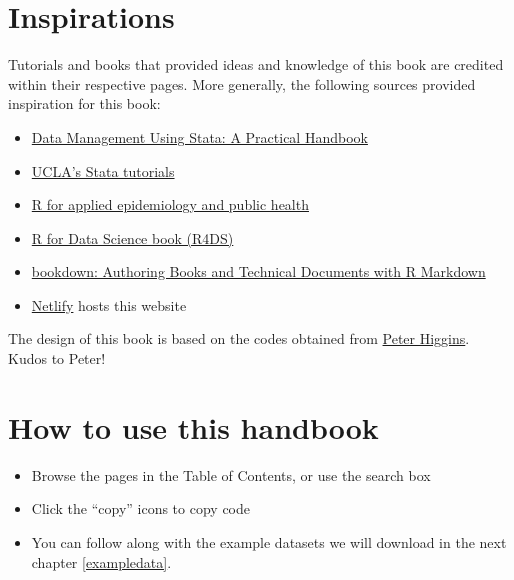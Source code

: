 \documentclass[
]{book}
\providecommand{\tightlist}{%
  \setlength{\itemsep}{0pt}\setlength{\parskip}{0pt}}
\begin{document}
\hypertarget{inspirations}{%
\section*{Inspirations}\label{inspirations}}

Tutorials and books that provided ideas and knowledge of this book are credited within their respective pages. More generally, the following sources provided inspiration for this book:

\begin{itemize}
\tightlist
\item
  \href{https://www.stata.com/bookstore/data-management-using-stata/}{Data Management Using Stata: A Practical Handbook}
\item
  \href{https://stats.idre.ucla.edu/stata/}{UCLA's Stata tutorials}
\item
  \href{https://www.epirhandbook.com/en/}{R for applied epidemiology and public health}
\item
  \href{https://r4ds.had.co.nz/}{R for Data Science book (R4DS)}\\
\item
  \href{https://bookdown.org/yihui/bookdown/}{bookdown: Authoring Books and Technical Documents with R Markdown}
\item
  \href{https://www.netlify.com}{Netlify} hosts this website
\end{itemize}

The design of this book is based on the codes obtained from \href{https://github.com/higgi13425/rmrwr-book}{Peter Higgins}. Kudos to Peter!

\hypertarget{how-to-use-this-handbook}{%
\section*{How to use this handbook}\label{how-to-use-this-handbook}}

\begin{itemize}
\tightlist
\item
  Browse the pages in the Table of Contents, or use the search box
\item
  Click the ``copy'' icons to copy code\\
\item
  You can follow along with the example datasets we will download in the next chapter \ref{exampledata}.
\end{itemize}
\end{document}
